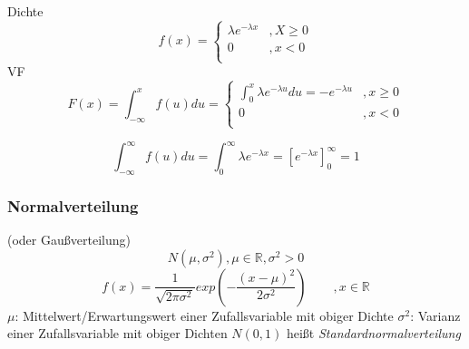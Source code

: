 \documentclass[a4paper,11pt]{article}
\begin{document}
\vspace{6pt}
\noindent Dichte
\begin{equation*}
f(x)=\begin{cases}
\lambda e^{-\lambda x} &, X\geq0\\
0 &, x<0\\
\end{cases}
\end{equation*}
\newline VF
\begin{equation*}
F(x)=\int_{-\infty}^{x}f(u)du = \begin{cases}
\int_{0}^{x}\lambda e^{-\lambda u}du = -e^{-\lambda u} &, x\geq0\\
0 &, x<0\\
\end{cases}
\end{equation*}


\[\int_{-\infty}^{\infty}f(u)du=\int_{0}^{\infty}\lambda e^{-\lambda x}=[e^{-\lambda x}]_0^\infty=1\]

\subsubsection{Normalverteilung} (oder Gaußverteilung)
\[N(\mu, \sigma^2),\mu\in\mathbb{R},\sigma^2>0\]
\[f(x)=\frac{1}{\sqrt{2\pi\sigma^2}}exp(-\frac{(x-\mu)^2}{2\sigma^2})\hspace{25pt}, x\in\mathbb{R}\]
\newline$\mu$: Mittelwert/Erwartungswert einer Zufallsvariable mit obiger Dichte
\newline$\sigma^2$: Varianz einer Zufallsvariable mit obiger Dichten
\newline $N(0,1)$ heißt \textit{Standardnormalverteilung}
\end{document}
